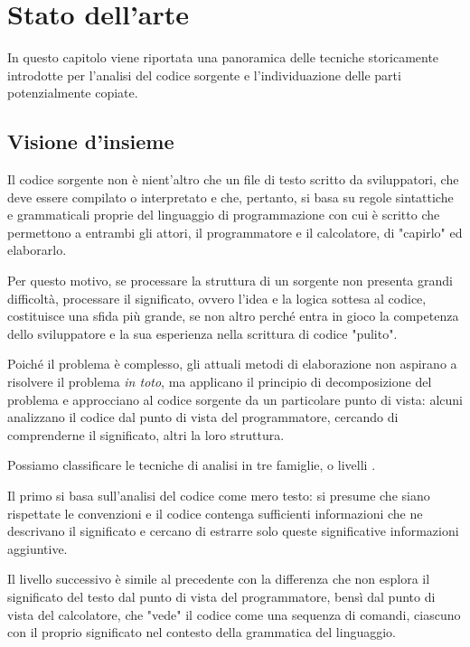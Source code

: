 \chapter{Stato dell'arte}
\label{chapter:stateOfArt}
In questo capitolo viene riportata una panoramica delle tecniche storicamente introdotte per l'analisi del codice sorgente e l'individuazione delle parti potenzialmente copiate.

\section{Visione d'insieme}
Il codice sorgente non è nient'altro che un file di testo scritto da sviluppatori, che deve essere compilato o interpretato e che, pertanto, si basa su regole sintattiche e grammaticali proprie del linguaggio di programmazione con cui è scritto che permettono a entrambi gli attori, il programmatore e il calcolatore, di "capirlo" ed elaborarlo.

Per questo motivo, se processare la struttura di un sorgente non presenta grandi difficoltà, processare il significato, ovvero l'idea e la logica sottesa al codice, costituisce una sfida più grande, se non altro perché entra in gioco la competenza dello sviluppatore e la sua esperienza nella scrittura di codice "pulito".

Poiché il problema è complesso, gli attuali metodi di elaborazione non aspirano a risolvere il problema \textit{in toto}, ma applicano il principio di decomposizione del problema e approcciano al codice sorgente da un particolare punto di vista: alcuni analizzano il codice dal punto di vista del programmatore, cercando di comprenderne il significato, altri la loro struttura.

Possiamo classificare le tecniche di analisi in tre famiglie, o livelli \cite{duracik-krsak-hrkut-2017}.

Il primo si basa sull'analisi del codice come mero testo: si presume che siano rispettate le convenzioni e il codice contenga sufficienti informazioni che ne descrivano il significato e cercano di estrarre solo queste significative informazioni aggiuntive.

Il livello successivo è simile al precedente con la differenza che non esplora il significato del testo dal punto di vista del programmatore, bensì dal punto di vista del calcolatore, che "vede" il codice come una sequenza di comandi, ciascuno con il proprio significato nel contesto della grammatica del linguaggio.

